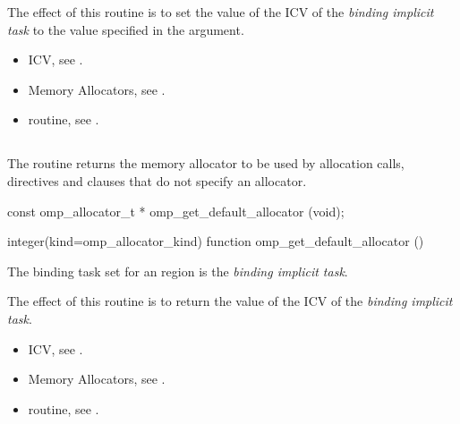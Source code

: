 \effect

The effect of this routine is to set the value of the  ICV of the \emph{binding implicit task} to the value specified in the  argument. 

\crossreferences

\begin{itemize}
\item {} ICV, see .
\item Memory Allocators, see .
\item {} routine, see .
\end{itemize}

\subsection{}
\label{subsec:omp_get_default_allocator}

\summary
The  routine returns the memory allocator to be used by allocation calls, directives and clauses that do not specify an allocator.

\format
\ccppspecificstart
\begin{boxedcode}
const omp_allocator_t * omp_get_default_allocator (void);
\end{boxedcode}
\ccppspecificend
\fortranspecificstart
\begin{boxedcode}
integer(kind=omp_allocator_kind) 
function omp_get_default_allocator ()
\end{boxedcode}
\fortranspecificend

\binding

The binding task set for an  region is the \emph{binding implicit task}.

\effect

The effect of this routine is to return the value of the  ICV of the \emph{binding implicit task}.

\crossreferences
\begin{itemize}
\item {} ICV, see .
\item Memory Allocators, see .
\item {} routine, see .
\end{itemize}

